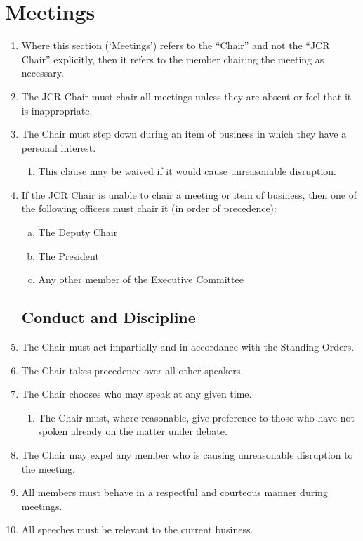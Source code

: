 \documentclass[12pt]{article}
\begin{document}
\section{Meetings}
\begin{enumerate}
    \subsection{The Chair}
    \item Where this section (`Meetings') refers to the ``Chair'' and not the ``JCR Chair'' explicitly, then it refers to the member chairing the meeting as necessary.
    \item The JCR Chair must chair all meetings unless they are absent or feel that it is inappropriate.
    \item The Chair must step down during an item of business in which they have a personal interest.
    \begin{enumerate}
        \item This clause may be waived if it would cause unreasonable disruption.
    \end{enumerate}
    \item If the JCR Chair is unable to chair a meeting or item of business, then one of the following officers must chair it (in order of precedence):
    \begin{enumerate}[(a)]
        \item The Deputy Chair
        \item The President
        \item Any other member of the Executive Committee
    \end{enumerate}
    \subsection{Conduct and Discipline}
    \item The Chair must act impartially and in accordance with the Standing Orders.
    \item The Chair takes precedence over all other speakers.
    \item The Chair chooses who may speak at any given time.
    \begin{enumerate}
        \item The Chair must, where reasonable, give preference to those who have not spoken already on the matter under debate.
    \end{enumerate}
    \item The Chair may expel any member who is causing unreasonable disruption to the meeting.
    \item All members must behave in a respectful and courteous manner during meetings.
    \item All speeches must be relevant to the current business.

\end{enumerate}
\end{document}
